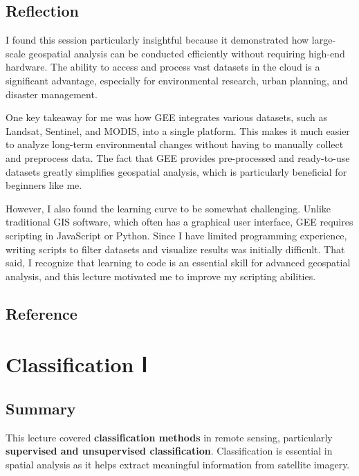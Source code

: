 \documentclass[
  letterpaper,
]{scrbook}
\begin{document}
\section{Reflection}\label{reflection-3}

I found this session particularly insightful because it demonstrated how
large-scale geospatial analysis can be conducted efficiently without
requiring high-end hardware. The ability to access and process vast
datasets in the cloud is a significant advantage, especially for
environmental research, urban planning, and disaster management.

One key takeaway for me was how GEE integrates various datasets, such as
Landsat, Sentinel, and MODIS, into a single platform. This makes it much
easier to analyze long-term environmental changes without having to
manually collect and preprocess data. The fact that GEE provides
pre-processed and ready-to-use datasets greatly simplifies geospatial
analysis, which is particularly beneficial for beginners like me.

However, I also found the learning curve to be somewhat challenging.
Unlike traditional GIS software, which often has a graphical user
interface, GEE requires scripting in JavaScript or Python. Since I have
limited programming experience, writing scripts to filter datasets and
visualize results was initially difficult. That said, I recognize that
learning to code is an essential skill for advanced geospatial analysis,
and this lecture motivated me to improve my scripting abilities.

\section{Reference}\label{reference-3}


\chapter{Classification Ⅰ}\label{classification-ux2170}

\section{Summary}\label{summary-3}

This lecture covered \textbf{classification methods} in remote sensing,
particularly \textbf{supervised and unsupervised classification}.
Classification is essential in spatial analysis as it helps extract
meaningful information from satellite imagery.
\end{document}
